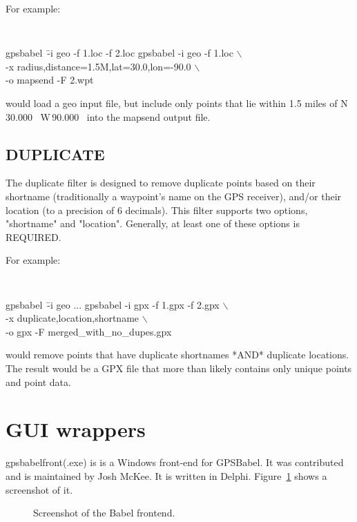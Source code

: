 \documentclass[12pt]{article}
\newcommand{\bsl}{$\backslash$}
\begin{document}
For example:
{\tt \small
\begin{tabbing}
gpsbabel~\= -i geo -f 1.loc -f 2.loc \kill
gpsbabel \> -i geo -f 1.loc \bsl \+ \\
						-x radius,distance=1.5M,lat=30.0,lon=-90.0 \bsl \\
						-o mapsend -F 2.wpt
\end{tabbing}
}
would load a {\sc geo} input file, but include only points that lie within 1.5 miles of N\,30.000 ~W\,90.000~ into the {\sc mapsend} output file. 



\subsection{DUPLICATE}

The duplicate filter is designed to remove duplicate points based
on their shortname (traditionally a waypoint's name on the GPS
receiver), and/or their location (to a precision of 6 decimals).
This filter supports two options, "shortname" and "location".
Generally, at least one of these options is REQUIRED.

For example:
{\tt \small
\begin{tabbing}
gpsbabel~\= -i geo ... \kill
gpsbabel \>	-i gpx -f 1.gpx -f 2.gpx  \bsl \+ \\
						-x duplicate,location,shortname \bsl \\
         		-o gpx -F merged\_with\_no\_dupes.gpx
\end{tabbing}
}
would remove points that have duplicate shortnames *AND* duplicate
locations.  The result would be a GPX file that more than likely
contains only unique points and point data.



\section{GUI wrappers}
\label{GUI}

gpsbabelfront(.exe) is is a Windows front-end for GPSBabel.  It was contributed and is
maintained by Josh McKee.   It is written in Delphi. Figure~\ref{babelfrontfig1} shows a screenshot of it.

\begin{figure}[htb]
\hfil{}\hfil
\caption{Screenshot of the Babel frontend.}
\label{babelfrontfig1}
\end{figure}
\end{document}
